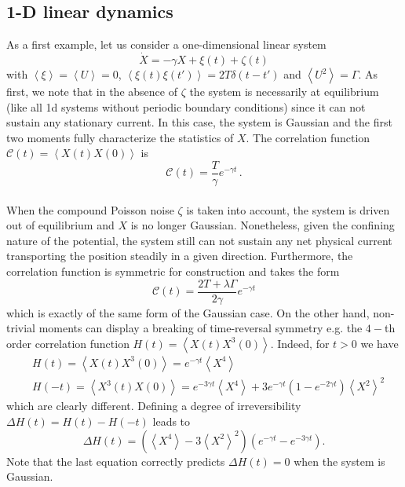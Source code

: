 \documentclass[12pt]{iopart}
\newcommand{\lx} {\left}
\newcommand{\rx} {\right}
\newcommand{\ave}[1] {\lx\langle #1 \rx\rangle}
\newcommand{\cC} {\mathcal{C}}
\begin{document}
\subsection{1-D linear dynamics}
As a first example, let us consider a one-dimensional linear system
\begin{equation}
    \dot{X}=-\gamma X + \xi(t)+\zeta(t)
\end{equation}
with $\ave{\xi}=\ave{U}=0$, $\ave{\xi(t)\xi(t')}=2T\delta(t-t')$ and $\ave{U^2}=\Gamma$. As first, we note that in the absence of $\zeta$ the system is necessarily at equilibrium (like all 1d systems without periodic boundary conditions) since it can not sustain any stationary current. In this case, the system is Gaussian and the first two moments fully characterize the statistics of $X$. The correlation function $\cC(t)=\ave{X(t)X(0)}$ is 
\begin{equation}
\cC(t)=\frac{T}{\gamma} e^{-\gamma t}\,.
\end{equation}\\
When the compound Poisson noise $\zeta$ is taken into account, the system is driven out of equilibrium and $X$ is no longer Gaussian. Nonetheless, given the confining nature of the potential, the system still can not sustain any net physical current  transporting the position steadily in a given  direction. Furthermore, the correlation function is symmetric for construction and takes the form
\begin{equation}
\cC(t)=\frac{2T+\lambda\Gamma}{2\gamma} e^{-\gamma t}
\end{equation}
which is exactly of the same form of the Gaussian case. On the other hand, non-trivial moments can display a breaking of time-reversal symmetry e.g. the $4-$th order correlation function $H(t)=\ave{X(t)X^3(0)}$. Indeed, for $t>0$ we have 
\begin{align}
&H(t)=\ave{X(t)X^3(0)}=e^{-\gamma t}\ave{X^4}\\
&H(-t)=\ave{X^3(t)X(0)}=e^{-3\gamma t}\ave{X^4}+3e^{-\gamma t}\lx(1-e^{-2\gamma t}\rx)\ave{X^2}^2
\end{align}
which are clearly different. Defining a degree of irreversibility $\Delta H (t)=H(t)-H(-t)$ leads to 
\begin{equation}
    \Delta H (t) = \lx(\ave{X^4}-3\ave{X^2}^2\rx)\lx(e^{-\gamma t}-e^{-3\gamma t}\rx).
\end{equation}
Note that the last equation correctly predicts $\Delta H(t)=0$ when the system is Gaussian.
\end{document}
